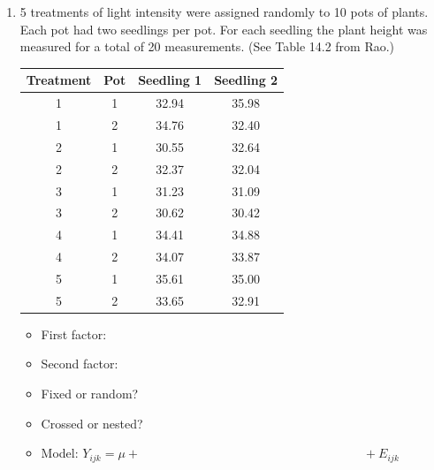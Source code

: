 \begin{enumerate}
\item 5 treatments of light intensity were assigned randomly to 10 pots of plants.  Each pot had two seedlings per pot.  For each seedling the plant height was measured for a total of 20 measurements. (See Table 14.2 from Rao.)
\begin{small}
\begin{center}
\begin{tabular}{cc|cc}
Treatment & Pot & Seedling 1 & Seedling 2 \\ \hline
1          &       1       &      32.94      &      35.98 \\
1          &       2       &      34.76      &      32.40 \\
2          &       1       &      30.55      &      32.64 \\
2          &       2       &      32.37      &      32.04 \\
3          &       1       &      31.23      &      31.09 \\
3          &       2       &      30.62      &      30.42 \\
4          &       1       &      34.41      &      34.88 \\
4          &       2       &      34.07      &      33.87 \\
5          &       1       &      35.61      &      35.00 \\
5          &       2       &      33.65      &      32.91 \\ \hline
\end{tabular}
\end{center}
\end{small}

\begin{itemize}
\item First factor:
\item Second factor:
\item Fixed or random?
\item Crossed or nested?
\item Model: $Y_{ijk} = \mu + \hspace{3in} + E_{ijk}$
\end{itemize}
\end{enumerate}

